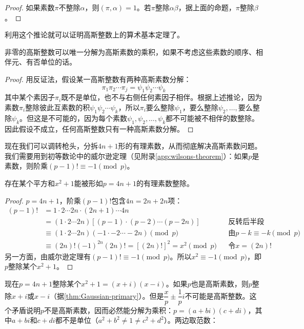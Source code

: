 \documentclass[b5paper]{ctexart}
\begin{document}
\begin{proof}
如果素数$\pi$不整除$\alpha$，则$(\pi, \alpha) = 1$。若$\pi$整除$\alpha \beta$，据上面的命题，$\pi$整除$\beta$。
\end{proof}

利用这个推论就可以证明高斯整数上的算术基本定理了。

\begin{theorem}[高斯整数上的算术基本定理]
非零的高斯整数可以唯一分解为高斯素数的乘积，如果不考虑这些素数的顺序、相伴元、有否单位的话。
\end{theorem}

\begin{proof}
用反证法，假设某一高斯整数有两种高斯素数分解：
\[
\pi_1 \pi_2 \dotsm \pi_j = \psi_1 \psi_2 \dotsm \psi_k
\]
其中某个素因子$\pi_i$既不是单位，也不与右侧任何素因子相伴。根据上述推论，因为素数$\pi_i$整除彼此互素数的积$\psi_1 \psi_2 \dotsm \psi_k$，所以$\pi_i$要么整除$\psi_1$，要么整除$\psi_2, \dotsc, $要么整除$\psi_k$。但这是不可能的，因为每个素数$\psi_1, \psi_2, \dotsc, \psi_k$都不可能被不相伴的数整除。因此假设不成立，任何高斯整数只有一种高斯素数分解。
\end{proof}

现在我们可以调转枪头，分拆$4n + 1$形的有理素数，从而彻底解决高斯素数问题。我们需要用到初等数论中的威尔逊定理（见附录\ref{app:wilsons-theorem}）：如果$p$是素数，则阶乘$(p - 1)! \equiv -1 \pmod p$。

\begin{lemma}
存在某个平方和$x^2 + 1$能被形如$p = 4n + 1$的有理素数整除。
\end{lemma}

\begin{proof}
$p = 4n + 1$，阶乘$(p - 1)!$包含$4n = 2n + 2n$项：
\begin{align*}
(p - 1)! &= 1 \cdot 2  \dotsm  2n \cdot (2n + 1)  \dotsm  4n \\
  &= (1 \cdot 2  \dotsm  2n)[(p - 1) \cdot (p - 2)  \dotsm  (p - 2n)] && \text{反转后半段} \\
  &\equiv (1 \cdot 2  \dotsm 2n)(-1 \cdot -2 \dotsm -2n) \pmod p && \text{由} p - k \equiv -k \pmod p \\
  &\equiv (2n)!(-1)^{2n}(2n)! = [(2n)!]^2 = x^2 \pmod p && \text{令} x = (2n)!
\end{align*}
另一方面，由威尔逊定理有$(p - 1)! \equiv -1 \pmod p$。所以$x^2 \equiv -1 \pmod p$，即$p$整除某个$x^2 + 1$。
\end{proof}

现在$p = 4n + 1$整除某个$x^2 + 1 = (x + i)(x - i)$。如果$p$也是高斯素数，则$p$整除$x + i$或$x - i$（据\cref{thm:Gaussian-primary}）。但是$\dfrac{x}{p} \pm \dfrac{1}{p}i$不可能是高斯整数。这个矛盾说明$p$不是高斯素数，因而必然能分解为乘积：$p = (a + bi)(c + di)$，其中$a + bi$和$c + di$都不是单位（$a^2 + b^2 \ne 1 \ne c^2 + d^2$）。两边取范数：
\end{document}
